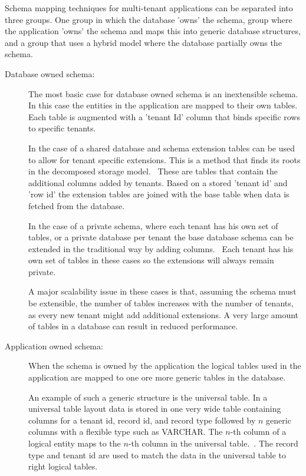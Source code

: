 Schema mapping techniques for multi-tenant applications can be separated into three groups. 
One group in which the database 'owns' the schema, group where the application 'owns' the schema and maps this into generic database structures, and a group that uses a hybrid model where the database partially owns the schema.~\cite{aulbach2009comparison}

\begin{description}
	\item[Database owned schema: ] The most basic case for database owned schema is an inextensible schema.
		In this case the entities in the application are mapped to their own tables.
		Each table is augmented with a 'tenant Id' column that binds specific rows to specific tenants.~\cite{aulbach2008multi}

		In the case of a shared database and schema extension tables can be used to allow for tenant specific extensions.
		This is a method that finds its roots in the decomposed storage model.~\cite{copeland1985decomposition}
		These are tables that contain the additional columns added by tenants. 
		Based on a stored 'tenant id' and 'row id' the extension tables are joined with the base table when data is fetched from the database.~\cite{aulbach2008multi}

		In the case of a private schema, where each tenant has his own set of tables, or a private database per tenant the base database schema can be extended in the traditional way by adding columns.~\cite{aulbach2009comparison}
		Each tenant has his own set of tables in these cases so the extensions will always remain private. 
	
		A major scalability issue in these cases is that, assuming the schema must be extensible, the number of tables increases with the number of tenants, as every new tenant might add additional extensions.
		A very large amount of tables in a database can result in reduced performance.~\cite{aulbach2008multi}
	\item[Application owned schema: ] When the schema is owned by the application the logical tables used in the application are mapped to one ore more generic tables in the database.
		
		An example of such a generic structure is the universal table. 
		In a universal table layout data is stored in one very wide table containing columns for a tenant id, record id, and record type followed by $n$ generic columns with a flexible type such as VARCHAR.
		The $n$-th column of a logical entity maps to the $n$-th column in the universal table.~\cite{aulbach2008multi}. The record type and tenant id are used to match the data in the universal table to right logical tables.


\end{description}
